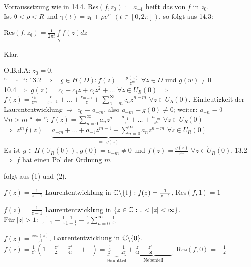 \documentclass[a4paper,twoside,DIV15,BCOR12mm]{scrbook}
\begin{document}
\begin{definition}
Vorraussetzung wie in 14.4. Res$(f, z_0) := a_{-1}$ heißt das 
von $f$ in $z_0$. \\
Ist $0 < \rho < R$ und $\gamma(t) = z_0 + \rho e ^{it}$ $( t \in [0, 2 \pi])$,
so folgt aus 14.3: \\ \centerline{Res$(f, z_0) = \frac{1}{2\pi i} \int\limits_{\gamma} f(z)
dz$}
\end{definition}

\begin{beweis}
\begin{liste}
\item Klar.
\item O.B.d.A: $z_0 = 0$. \\
`` $\Rightarrow$ ``: 13.2 $\Rightarrow$ $\exists g \in H(D): f(z) =
\frac{g(z)}{z^m}$ $\forall z \in \dot{D}$ und $g(w) \neq 0$  \\
10.4 $\Rightarrow$ $g(z) = c_0 + c_1z + c_2 z^2 + \ldots $ $\forall z \in
U_R(0)$ $\Rightarrow$ $f(z) = \frac{c_0}{z^m}  + \frac{c_1}{z^{m-1}} + \ldots +
\frac{c_{m-1}}{z} + \sum\limits_{n=m}^{\infty} c_n z^{n-m}$ $\forall z \in
\dot{U}_R(0)$. Eindeutigkeit der Laurententwicklung $\Rightarrow$ $c_0 =
a_{-m}$, also $a_{-m} = g(0) \neq 0$; weiter: $a_{-n} = 0$ $\forall n > m$
``$\Leftarrow$'': $f(z) = \sum\limits_{n=0}^{\infty} a_n z^n + \frac{a_{-1}}{z}
+ \ldots + \frac{a_{-m}}{z^m}$ $\forall z \in \dot{U}_R(0)$ \\
$\Rightarrow$ $z^m f(z) = \underbrace{a_{-m} + \ldots + a_{-1} z ^{m-1} +
\sum\limits_{n=0}^{\infty} a_n z^{n+m}}_{ =: g(z)}$ $\forall z \in \dot{U}_R(0)$
\\
Es ist $g \in H(U_R(0))$, $g(0) = a_{-m} \neq 0$ und $f(z) = \frac{g(z)}{z^m}$
$\forall z \in \dot{U}_R(0)$. 13.2 $\Rightarrow$ $f$ hat einen Pol der Ordnung $m$.
\item folgt aus (1) und (2).
\end{liste}
\end{beweis}

\begin{beispiele}
\begin{liste}
\item $f(z) = \frac{1}{z-1}$ Laurententwicklung in $\mathbb{C} \backslash \{1\}: f(z)
= \frac{1}{z-1}$, Res$(f,1) = 1$
\item  $f(z) = \frac{1}{z-1}$ Laurententwicklung in $\{ z \in \mathbb{C} : 1 < |z| <
\infty \}$.\\ Für $|z| >
1: $ $\frac{1}{z-1} = \frac{1}{z} \frac{1}{1- \frac{1}{z}} = 
\frac{1}{z} \sum\limits_{n=0}^{\infty} \frac{1}{z^n}$
\item $f(z) = \frac{cos(z)}{z^3}.$ Laurententwicklung in $\mathbb{C} \backslash
\{0\}$. $f(z) = \frac{1}{z^3}(1 - \frac{z^2}{2!} + \frac{z^4}{4!} -+ \ldots)
= \underbrace{\frac{1}{z^3} - \frac{1}{2z}}_{\text{Hauptteil}} + \underbrace{\frac{z}{4!}-
\frac{z^3}{6!} +- \ldots}_{\text{Nebenteil}}$, Res$(f,0) = -\frac{1}{2}$
\end{liste}
\end{beispiele}
\end{document}
